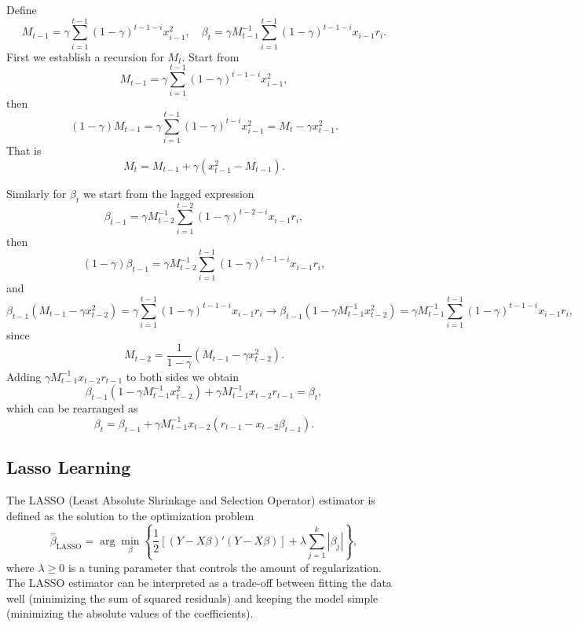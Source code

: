 \documentclass[11pt]{article}
\begin{document}
Define 
\begin{equation}
    M_{t-1} = \gamma \sum^{t-1}_{i=1} {(1 - \gamma)^{t-1-i}} x_{i-1}^2, \quad \beta_{t} = \gamma M^{-1}_{t-1} \sum^{t-1}_{i=1} {(1 - \gamma)^{t-1-i}} x_{i-1} r_i.
\end{equation}
First we establish a recursion for $M_t$. Start from
\begin{equation}
M_{t-1} = \gamma \sum^{t-1}_{i=1} {(1 - \gamma)^{t-1-i}} x_{i-1}^2,
\end{equation}
then
\begin{equation}
(1 - \gamma) M_{t-1} = \gamma \sum^{t-1}_{i=1} {(1 - \gamma)^{t-i}} x_{i-1}^2 = M_t - \gamma x_{t-1}^2.
\end{equation}
That is
\begin{equation}
    M_t = M_{t-1} + \gamma \left(x_{t-1}^2 - M_{t-1} \right).
\end{equation}

Similarly for $\beta_t$ we start from the lagged expression
\begin{equation}
    \beta_{t-1} = \gamma M^{-1}_{t-2} \sum^{t-2}_{i=1} {(1 - \gamma)^{t-2-i}} x_{i-1} r_i,
\end{equation}
then
\begin{equation}
    (1- \gamma) \beta_{t-1} = \gamma M^{-1}_{t-2} \sum^{t-1}_{i=1} {(1 - \gamma)^{t-1-i}} x_{i-1} r_i ,
\end{equation}
and
\begin{equation}
 \beta_{t-1} ( M_{t-1} - \gamma x_{t-2}^2) =  \gamma \sum^{t-1}_{i=1} {(1 - \gamma)^{t-1-i}} x_{i-1} r_i \rightarrow \beta_{t-1} (1 - \gamma M^{-1}_{t-1} x_{t-2}^2) = \gamma M^{-1}_{t-1} \sum^{t-1}_{i=1} {(1 - \gamma)^{t-1-i}} x_{i-1} r_i,
\end{equation}
since \[M_{t-2} = \frac{1}{1 - \gamma} (M_{t-1} - \gamma x_{t-2}^2).\]
Adding $\gamma M^{-1}_{t-1} x_{t-2} r_{t-1}$ to both sides we obtain
\begin{equation}
    \beta_{t-1} (1 - \gamma M^{-1}_{t-1} x_{t-2}^2) + \gamma M^{-1}_{t-1} x_{t-2} r_{t-1} = \beta_t,
\end{equation}
which can be rearranged as
\begin{equation}
    \beta_t = \beta_{t-1} + \gamma M^{-1}_{t-1} x_{t-2} (r_{t-1} - x_{t-2} \beta_{t-1}).
\end{equation}

\subsection{Lasso Learning}\label{app:lasso}
The LASSO (Least Absolute Shrinkage and Selection Operator) estimator is defined as the solution to the optimization problem
\[
\hat{\beta}_{\text{LASSO}} = \arg\min_{\beta} \left\{\frac{1}{2}\left[(Y - X\beta)'(Y - X\beta)\right] + \lambda \sum_{j=1}^{k} |\beta_j|\right\},
\]
where $\lambda \geq 0$ is a tuning parameter that controls the amount of regularization. The LASSO estimator can be interpreted as a trade-off between fitting the data well (minimizing the sum of squared residuals) and keeping the model simple (minimizing the absolute values of the coefficients).
\end{document}
